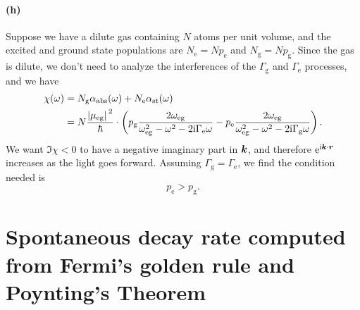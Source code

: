 \documentclass[hyperref, a4paper]{article}
\newcommand*{\ii}{\mathrm{i}}
\newcommand*{\ee}{\mathrm{e}}
\newcommand*{\Gammae}{\Gamma_{\text{e}}}
\newcommand*{\Gammag}{\Gamma_{\text{g}}}
\newcommand*{\omegaeg}{\omega_{\text{eg}}}
\begin{document}
\paragraph{(h)} Suppose we have a dilute gas containing $N$ atoms per unit volume,
and the excited and ground state populations are 
$N_{\text{e}} = N p_{\text{e}}$ and 
$N_{\text{g}} = N p_{\text{g}}$.
Since the gas is dilute, we don't need to analyze the interferences of 
the $\Gammag$ and $\Gammae$ processes, 
and we have 
\begin{equation}
    \begin{aligned}
        \chi(\omega) &= N_{\text{g}} \alpha_{\text{abs}}(\omega)
        + N_{\text{e}} \alpha_{\text{st}}(\omega) \\
        &= N \frac{\abs*{\mu_{\text{eg}}}^2}{\hbar} \cdot 
        \left(
            p_{\text{g}} \frac{2\omegaeg}{
                \omegaeg^2 - \omega^2 - 2 \ii \Gammae \omega
            } 
            - p_{\text{e}} \frac{ 2 \omegaeg}{
                \omegaeg^2 - \omega^2 - 2 \ii \Gammag \omega
            }
        \right) .
    \end{aligned}
\end{equation}
We want $\Im \chi < 0$ 
to have a negative imaginary part in $\vb*{k}$,
and therefore $\ee^{\ii \vb*{k} \cdot \vb*{r}}$ increases as the light goes forward.
Assuming $\Gammag = \Gammae$, we find the condition needed is 
\begin{equation}
    p_{\text{e}} > p_{\text{g}}.
\end{equation}

\section{Spontaneous decay rate computed from Fermi's golden rule and Poynting's Theorem}
\end{document}
